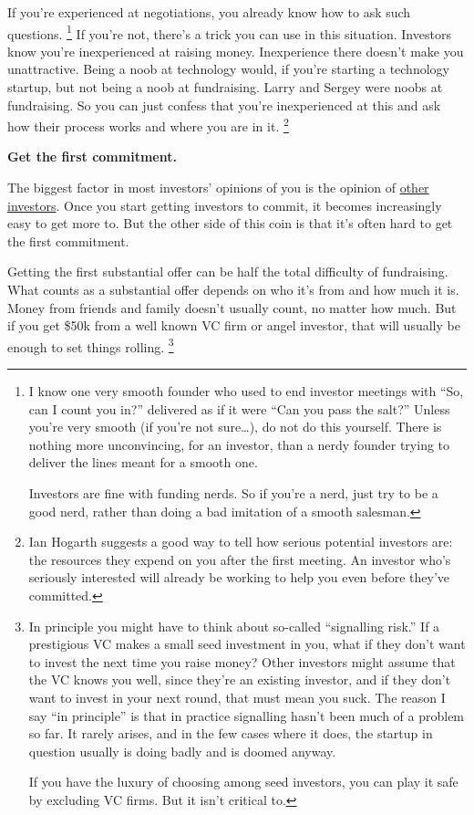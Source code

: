 If you're experienced at negotiations, you already know how to ask such
questions. \footnote{I know one very smooth founder who used to end investor
meetings with ``So, can I count you in?'' delivered as if it were ``Can
you pass the salt?'' Unless you're very smooth (if you're not
sure\ldots), do not do this yourself. There is nothing more
unconvincing, for an investor, than a nerdy founder trying to deliver
the lines meant for a smooth one.

Investors are fine with funding nerds. So if you're a nerd, just try to
be a good nerd, rather than doing a bad imitation of a smooth salesman.} If you're not, there's a trick you
can use in this situation. Investors know you're inexperienced at
raising money. Inexperience there doesn't make you unattractive. Being a
noob at technology would, if you're starting a technology startup, but
not being a noob at fundraising. Larry and Sergey were noobs at
fundraising. So you can just confess that you're inexperienced at this
and ask how their process works and where you are in it.
\footnote{Ian Hogarth suggests a good way to tell how serious potential
investors are: the resources they expend on you after the first meeting.
An investor who's seriously interested will already be working to help
you even before they've committed.}

\textbf{Get the first commitment.}

The biggest factor in most investors' opinions of you is the opinion of
\href{herd.html}{other investors}. Once you start getting investors to
commit, it becomes increasingly easy to get more to. But the other side
of this coin is that it's often hard to get the first commitment.

Getting the first substantial offer can be half the total difficulty of
fundraising. What counts as a substantial offer depends on who it's from
and how much it is. Money from friends and family doesn't usually count,
no matter how much. But if you get \$50k from a well known VC firm or
angel investor, that will usually be enough to set things rolling.
\footnote{In principle you might have to think about so-called
``signalling risk.'' If a prestigious VC makes a small seed investment
in you, what if they don't want to invest the next time you raise money?
Other investors might assume that the VC knows you well, since they're
an existing investor, and if they don't want to invest in your next
round, that must mean you suck. The reason I say ``in principle'' is
that in practice signalling hasn't been much of a problem so far. It
rarely arises, and in the few cases where it does, the startup in
question usually is doing badly and is doomed anyway.

If you have the luxury of choosing among seed investors, you can play it
safe by excluding VC firms. But it isn't critical to.}

